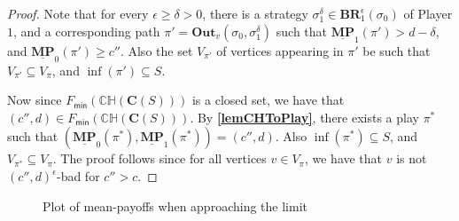 \begin{proof}
Note that for every $\epsilon \ge \delta > 0$, there is a strategy $\sigma_1^\delta \in \mathbf{BR}_1^{\epsilon}(\sigma_0)$ of Player $1$, and a corresponding path $\pi' = \mathbf{Out}_v(\sigma_0, \sigma_1^\delta)$ such that $\underline{\mathbf{MP}}_1(\pi') > d-\delta$, and $\underline{\mathbf{MP}}_0(\pi') \geqslant c''$.
Also the set $V_{\pi'}$ of vertices appearing in $\pi'$ be such that $V_{\pi'} \subseteq V_\pi$, and $\inf(\pi') \subseteq S$.

Now since $F_{\mathsf{min}}(\mathbb{CH}(\mathbf{C}(S)))$ is a closed set, we have that $(c'',d) \in F_{\mathsf{min}}(\mathbb{CH}(\mathbf{C}(S)))$.
By \textbf{\cref{lemCHToPlay}}, there exists a play $\pi^*$ such that $(\underline{\mathbf{MP}}_0(\pi^*), \underline{\mathbf{MP}}_1(\pi^*)) = (c'',d)$.
Also $\inf(\pi^*) \subseteq S$, and $V_{\pi^*} \subseteq V_{\pi}$.
The proof follows since for all vertices $v \in V_\pi$, we have that $v$ is not $(c'',d)^{\epsilon}$-bad for $c'' > c$.
\end{proof}

\begin{figure}
    \centering
    \caption{Plot of mean-payoffs when approaching the limit}
    \label{fig:plot_mp_limit}
\end{figure}

